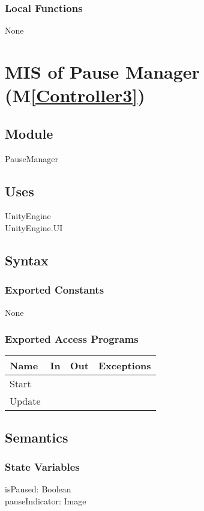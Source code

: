 \documentclass[12pt, titlepage]{article}
\newcommand{\mref}[1]{M\ref{#1}}
\begin{document}
\subsubsection{Local Functions}
None
\newpage

\section{MIS of Pause Manager (\mref{Controller3})} 

\subsection{Module}
PauseManager
\subsection{Uses}
UnityEngine\\
UnityEngine.UI\\
\subsection{Syntax}

\subsubsection{Exported Constants}
None

\subsubsection{Exported Access Programs}
\begin{center}
\begin{tabular}{|p{3cm}|p{4cm}|p{4cm}| p{5cm}|}
\hline
\textbf{Name} & \textbf{In} & \textbf{Out} & \textbf{Exceptions} \\
\hline
 Start& &  & \\
 \hline
 Update& &  & \\
\hline
\end{tabular}
\end{center}

\subsection{Semantics}

\subsubsection{State Variables}
isPaused: Boolean\\
pauseIndicator: Image 
\end{document}
